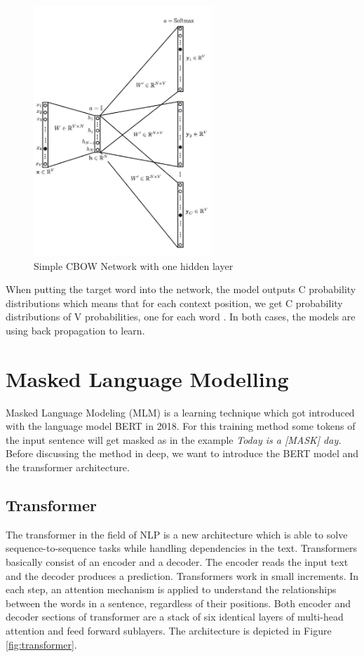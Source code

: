 \begin{figure}[H]
	\centering
	\includegraphics[width=0.6\textwidth]{figures/sgram_network.png}
	\caption{Simple CBOW Network with one hidden layer}
	\label{fig:sgram_network}
\end{figure}

When putting the target word into the network, the model outputs C probability distributions which means that for each context position, we get C probability distributions of V probabilities, one for each word \cite{word2vec}.
\newline
In both cases, the models are using back propagation to learn.

\section{Masked Language Modelling}
Masked Language Modeling (MLM) is a learning technique which got introduced with the language model BERT in 2018. For this training method some tokens of the input sentence will get masked as in the example \textit{Today is a [MASK] day.} Before discussing the method in deep, we want to introduce the BERT model and the transformer architecture.

\subsection{Transformer} \label{chap:transformer}
The transformer in the field of NLP is a new architecture which is able to solve sequence-to-sequence tasks while handling dependencies in the text. Transformers basically consist of an encoder and a decoder. The encoder reads the input text and the decoder produces a prediction. Transformers work in small increments. In each step, an attention mechanism is applied to understand the relationships between the words in a sentence, regardless of their positions. Both encoder and decoder sections of transformer are a stack of six identical layers of multi-head attention and feed forward sublayers. The architecture is depicted in Figure \ref{fig:transformer}.

